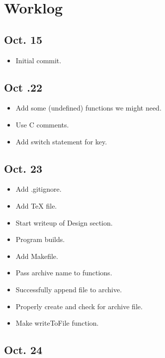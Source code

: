 \documentclass[12pt,letterpaper]{article}
\begin{document}
\section*{Worklog}

\subsection*{Oct. 15}

\begin{itemize}
	\item Initial commit.
\end{itemize}

\subsection*{Oct .22}

\begin{itemize}
	\item Add some (undefined) functions we might need.
	\item Use C comments.
	\item Add switch statement for key.
\end{itemize}

\subsection*{Oct. 23}

\begin{itemize}
	\item Add .gitignore.
	\item Add TeX file.
	\item Start writeup of Design section.
	\item Program builds.
	\item Add Makefile.
	\item Pass archive name to functions.
	\item Successfully append file to archive.
	\item Properly create and check for archive file.
	\item Make writeToFile function.
\end{itemize}

\subsection*{Oct. 24}
\end{document}
